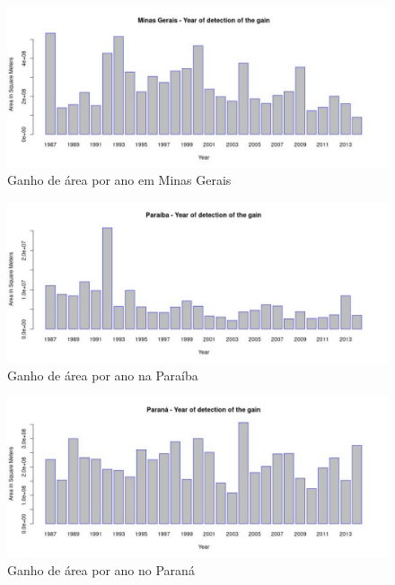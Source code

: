 \begin{figure}[H]
    \centering
    \includegraphics[scale=.5]{images/gain_graphics/Minas Gerais_gain.pdf}
    \caption{Ganho de área por ano em Minas Gerais}
    \label{fig:gain_minas_gerais}
\end{figure}

\begin{figure}[H]
    \centering
    \includegraphics[scale=.5]{images/gain_graphics/Paraiba_gain.pdf}
    \caption{Ganho de área por ano na Paraíba}
    \label{fig:gain_paraiba}
\end{figure}

\begin{figure}[H]
    \centering
    \includegraphics[scale=.5]{images/gain_graphics/Parana_gain.pdf}
    \caption{Ganho de área por ano no Paraná}
    \label{fig:gain_parana}
\end{figure}

